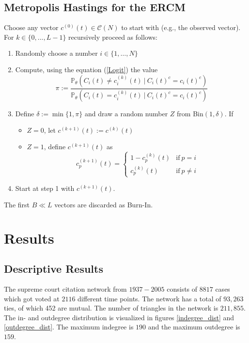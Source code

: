 \documentclass[headsepline=true, abstracton]{scrartcl}
\begin{document}
\subsection*{Metropolis Hastings for the ERCM}\label{networksimulation}
Choose any vector $c^{(0)}(t) \in \mathcal{C}(N)$ to start with (e.g., the observed vector). For $k \in \{0,...,L-1\}$ recursively proceed as follows:\\
\begin{enumerate}
\item Randomly choose a number $i\in \{1,\dots, N\}$
\item Compute, using the equation (\ref{Logit}) the value
$$\pi := \dfrac{\mathbb{P}_{\theta}(C_{i}(t) \neq c_{i}^{(k)}(t) ~| ~C_i(t)^c=c_i(t)^c)}{\mathbb{P}_{\theta}(C_{i}(t) = c_{i}^{(k)}(t) ~| ~C_i(t)^c=c_i(t)^c)}$$
\item Define $\delta:= \min\{1, \pi\}$ and draw a random number $Z$ from Bin$(1, \delta)$. If
\begin{itemize}
\item $Z=0$, let $c^{(k+1)}(t) := c^{(k)}(t)$ 
\item $Z=1$, define $c^{(k+1)}(t)$ as
$$c_{p}^{(k+1)}(t)=\begin{cases}
1-c_{p}^{(k)}(t)& \text{if}~ p=i \\
c_{p}^{(k)}(t) &\text{if}~ p \neq i 
\end{cases}$$
\end{itemize}
\item Start at step 1 with $c^{(k+1)}(t)$.
\end{enumerate}
The first $B \ll L$ vectors are discarded as Burn-In.


 \section{Results}
  \subsection*{Descriptive Results}
The supreme court citation network from $1937 - 2005$ consists of $8817$ cases which got voted at $2116$ different time points. The network has a total of $93,263$ ties, of which 452 are mutual. The number of triangles in the network is $211,855$. The in- and outdegree distribution is visualized in figures \ref{indegree_dist} and \ref{outdegree_dist}. The maximum indegree is $190$ and the maximum outdegree is $159$.
\end{document}
